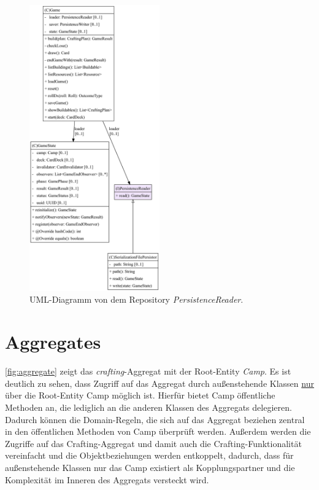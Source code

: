 \begin{figure}[H]
	\centering
	\includegraphics[width=0.5\textwidth]{Bilder/PersistenceReader_structure.pdf} 
	\caption{UML-Diagramm von dem Repository \textit{PersistenceReader}.}
	\label{fig:repository}
\end{figure} 

\section{Aggregates}

\autoref{fig:aggregate} zeigt das \textit{crafting}-Aggregat mit der Root-Entity \textit{Camp}. Es ist deutlich zu sehen,
dass Zugriff auf das Aggregat durch außenstehende Klassen \underline{nur} über die Root-Entity Camp möglich ist.
Hierfür bietet Camp öffentliche Methoden an, die lediglich an die anderen Klassen des Aggregats delegieren.
Dadurch können die Domain-Regeln, die sich auf das Aggregat beziehen zentral in den öffentlichen Methoden von Camp überprüft werden.
Außerdem werden die Zugriffe auf das Crafting-Aggregat und damit auch die Crafting-Funktionalität vereinfacht und die Objektbeziehungen 
werden entkoppelt, dadurch, dass für außenstehende Klassen nur das Camp existiert als Kopplungspartner und die Komplexität im 
Inneren des Aggregats versteckt wird. 

